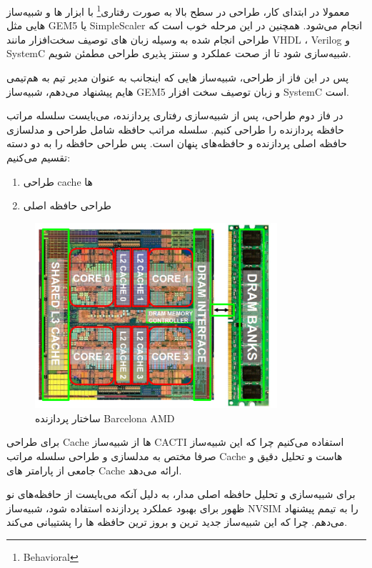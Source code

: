 \documentclass[12pt]{exam}
\begin{document}
\begin{questions}
  معمولا در ابتدای کار، طراحی در سطح بالا به صورت رفتاری\footnote{Behavioral} با ابزار ها و شبیه‌ساز هایی مثل GEM5 یا SimpleScaler انجام می‌شود. همچنین در این مرحله خوب است که طراحی انجام شده به وسیله زبان‌ های توصیف سخت‌افزار مانند VHDL ، Verilog و SystemC شبیه‌سازی شود تا از صحت عملکرد و سنتز ‌پذیری طراحی مطمئن شویم.
  
  پس در این فاز از طراحی، شبیه‌ساز هایی که اینجانب به عنوان مدیر تیم به هم‌تیمی هایم پیشنهاد می‌دهم، شبیه‌ساز GEM5 و زبان توصیف سخت افزار SystemC است.
  
  در فاز دوم طراحی، پس از شبیه‌سازی رفتاری پردازنده، می‌بایست سلسله مراتب حافظه پردازنده را طراحی کنیم. سلسله مراتب حافظه شامل طراحی و مدلسازی حافظه اصلی پردازنده و حافظه‌های پنهان است. پس طراحی حافظه را به دو دسته تقسیم می‌کنیم:
  
  \begin{enumerate}
  	\item طراحی cache ها
  	\item طراحی حافظه اصلی
  \end{enumerate}
  
    \begin{figure}[h]
  	\centering
  	\includegraphics[width=0.8\textwidth]{images/img19}
  	\caption{ساختار پردازنده Barcelona AMD}
  	\label{ساختار پردازنده Barcelona AMD}
  \end{figure}
  
  برای طراحی Cache ها از شبیه‌ساز CACTI استفاده می‌کنیم چرا که این شبیه‌ساز صرفا مختص به مدلسازی و طراحی سلسله مراتب Cache هاست و تحلیل دقیق و جامعی از پارامتر های Cache ارائه می‌دهد.
  
  برای شبیه‌سازی و تحلیل حافظه اصلی مدار، به دلیل آنکه می‌بایست از حافظه‌های نو ظهور برای بهبود عملکرد پردازنده استفاده شود، شبیه‌ساز NVSIM را به تیمم پیشنهاد می‌دهم. چرا که این شبیه‌ساز جدید ترین و بروز ترین حافظه ها را پشتیبانی می‌کند.
  

\end{questions}
\end{document}
